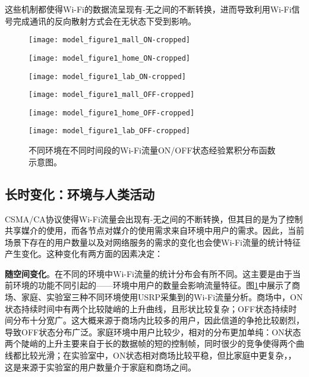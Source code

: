 这些机制都使得Wi-Fi的数据流呈现有-无之间的不断转换，进而导致利用Wi-Fi信号完成通讯的反向散射方式会在无状态下受到影响。
\begin{figure}
	\begin{minipage}[b]{.32\linewidth}
		\texttt{[image: model\_figure1\_mall\_ON-cropped]}
		\label{fig:ecdf_mall_on}
	\end{minipage}
	\hfill
	\begin{minipage}[b]{.32\linewidth}
		\texttt{[image: model\_figure1\_home\_ON-cropped]}
		\label{fig:ecdf_home_on}
	\end{minipage}
	\hfill
	\begin{minipage}[b]{.32\linewidth}
		\texttt{[image: model\_figure1\_lab\_ON-cropped]}
		\label{fig:ecdf_lab_on}
	\end{minipage}
	
	\begin{minipage}[b]{.32\linewidth}
		\texttt{[image: model\_figure1\_mall\_OFF-cropped]}
		\label{fig:ecdf_mall_off}
	\end{minipage}
	\hfill
	\begin{minipage}[b]{.32\linewidth}
		\texttt{[image: model\_figure1\_home\_OFF-cropped]}
		\label{fig:ecdf_home_off}
	\end{minipage}
	\hfill
	\begin{minipage}[b]{.32\linewidth}
		\texttt{[image: model\_figure1\_lab\_OFF-cropped]}
		\label{fig:ecdf_lab_off}
	\end{minipage}
	\caption{不同环境在不同时间段的Wi-Fi流量ON/OFF状态经验累积分布函数示意图。}\label{fig:ecdf}
\end{figure}
\subsection{长时变化：环境与人类活动}
CSMA/CA协议使得Wi-Fi流量会出现有-无之间的不断转换，但其目的是为了控制共享媒介的使用，而各节点对媒介的使用需求来自环境中用户的需求。因此，当前场景下存在的用户数量以及对网络服务的需求的变化也会使Wi-Fi流量的统计特征产生变化。这种变化有两方面的因素决定：

\textbf{随空间变化}。在不同的环境中Wi-Fi流量的统计分布会有所不同。这主要是由于当前环境的功能不同引起的——环境中用户的数量会影响流量特征。图\ref{fig:ecdf}中展示了商场、家庭、实验室三种不同环境使用USRP采集到的Wi-Fi流量分析。商场中，ON状态持续时间中有两个比较陡峭的上升曲线，且形状比较复杂；OFF状态持续时间分布十分宽广。这大概来源于商场内比较多的用户，因此信道的争抢比较剧烈，导致OFF状态分布广泛。家庭环境中用户比较少，相对的分布更加单纯：ON状态两个陡峭的上升主要来自于长的数据帧的短的控制帧，同时很少的竞争使得两个曲线都比较光滑；在实验室中，ON状态相对商场比较平稳，但比家庭中更复杂，，这是来源于实验室的用户数量介于家庭和商场之间。

